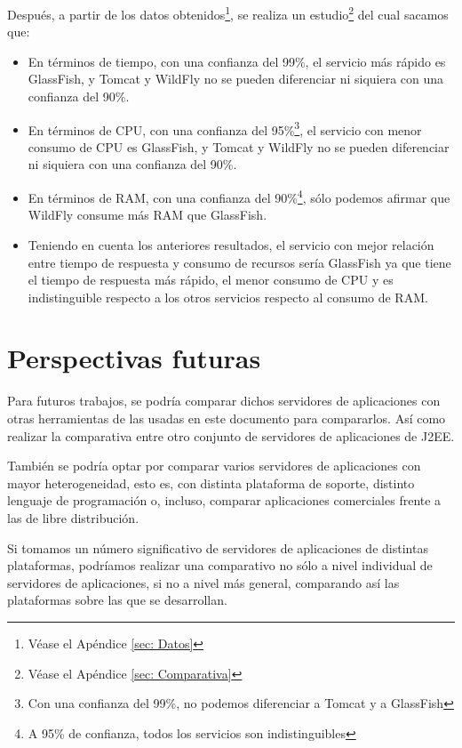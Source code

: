 \documentclass[a4paper, 10pt]{article}
\begin{document}
	Después, a partir de los datos obtenidos\footnote{Véase el Apéndice \ref{sec: Datos}}, se realiza
	un estudio\footnote{Véase el Apéndice \ref{sec: Comparativa}} del cual sacamos que:
	\begin{itemize}
		\item En términos de tiempo, con una confianza del 99\%, el servicio más rápido es GlassFish, y
		Tomcat y WildFly no se pueden diferenciar ni siquiera con una confianza del 90\%.
		\item En términos de CPU, con una confianza del 95\%\footnote{Con una confianza del 99\%,
		no podemos diferenciar a Tomcat y a GlassFish}, el servicio con menor consumo de CPU es GlassFish,
		y Tomcat y WildFly no se pueden diferenciar ni siquiera con una confianza del 90\%.
		\item En términos de RAM, con una confianza del 90\%\footnote{A 95\% de confianza, todos los
		servicios son indistinguibles}, sólo podemos afirmar que WildFly consume más RAM que GlassFish.
		\item Teniendo en cuenta los anteriores resultados, el servicio con mejor relación entre tiempo
		de respuesta y consumo de recursos sería GlassFish ya que tiene el tiempo de respuesta más rápido,
		el menor consumo de CPU y es indistinguible respecto a los otros servicios respecto al consumo
		de RAM.
	\end{itemize} 
	
\section{Perspectivas futuras}
	Para futuros trabajos, se podría comparar dichos servidores de aplicaciones con otras herramientas
	de las usadas en este documento para compararlos. Así como realizar la comparativa entre otro
	conjunto de servidores de aplicaciones de J2EE.
	
	También se podría optar por comparar varios servidores de aplicaciones con mayor heterogeneidad,
	esto es, con distinta plataforma de soporte, distinto lenguaje de programación o, incluso,
	comparar aplicaciones comerciales frente a las de libre distribución.
	
	Si tomamos un número significativo de servidores de aplicaciones de distintas plataformas,
	podríamos realizar una comparativo no sólo a nivel individual de servidores de aplicaciones, si
	no a nivel más general, comparando así las plataformas sobre las que se desarrollan.
	
\end{document}
